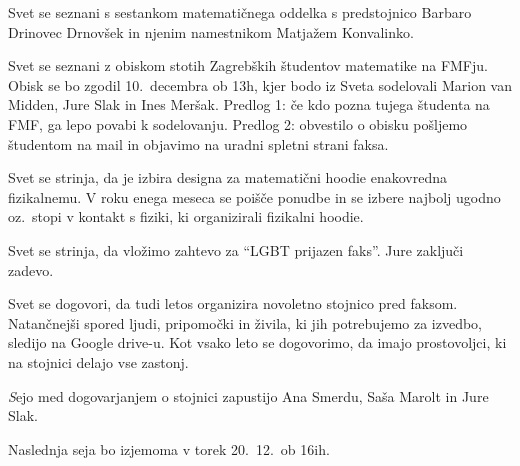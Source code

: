\documentclass{seja}
\begin{document}
\begin{ad}
Svet se seznani s sestankom matematičnega oddelka s predstojnico Barbaro
Drinovec Drnovšek in njenim namestnikom Matjažem Konvalinko.

\item
Svet se seznani z obiskom stotih Zagrebških študentov matematike na FMFju.
Obisk se bo zgodil 10.\ decembra ob 13h, kjer bodo iz Sveta sodelovali Marion
van Midden, Jure Slak in Ines Meršak.  Predlog 1: če kdo pozna tujega študenta
na FMF, ga lepo povabi k sodelovanju.  Predlog 2: obvestilo o obisku pošljemo
študentom na mail in objavimo na uradni spletni strani faksa.

\item
Svet se strinja, da je izbira designa za matematični hoodie enakovredna
fizikalnemu.  V roku enega meseca se poišče ponudbe in se izbere najbolj ugodno
oz.\ stopi v kontakt s fiziki, ki organizirali fizikalni hoodie.

\item
Svet se strinja, da vložimo zahtevo za ``LGBT prijazen faks''.
Jure zaključi zadevo.

\item
Svet se dogovori, da tudi letos organizira novoletno stojnico pred faksom.
Natančnejši spored ljudi, pripomočki in živila, ki jih potrebujemo za izvedbo,
sledijo na Google drive-u.
Kot vsako leto se dogovorimo, da imajo prostovoljci, ki na stojnici delajo vse zastonj.

\textit Sejo med dogovarjanjem o stojnici zapustijo Ana Smerdu, Saša Marolt in Jure Slak.

Naslednja seja bo izjemoma v torek 20.~12.~ob 16ih.
\end{ad}
\end{document}
